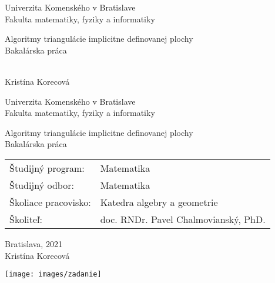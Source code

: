 \documentclass[12pt, twoside]{book}
\def\mfrok{2021}
\def\mfnazov{Algoritmy triangulácie implicitne definovanej plochy}
\def\mftyp{Bakalárska práca}
\def\mfautor{Kristína Korecová}
\def\mfskolitel{doc. RNDr. Pavel Chalmovianský, PhD. }
\def\mfkonzultant{tit. Meno Priezvisko, tit. }
\def\mfmiesto{Bratislava, \mfrok}
\def\mfodbor{ Matematika }
\def\program{ Matematika }
\def\mfpracovisko{ Katedra algebry a geometrie }
\begin{document}
     
\frontmatter


\thispagestyle{empty}

\begin{center}
\sc\large
Univerzita Komenského v Bratislave\\
Fakulta matematiky, fyziky a informatiky

\vfill

{\LARGE\mfnazov}\\
\mftyp
\end{center}

\vfill

{\sc\large 
\noindent \mfrok\\
\mfautor
}

\cleardoublepage


\thispagestyle{empty}
\noindent

\begin{center}
\sc  
\large
Univerzita Komenského v Bratislave\\
Fakulta matematiky, fyziky a informatiky

\vfill

{\LARGE\mfnazov}\\
\mftyp
\end{center}

\vfill

\noindent
\begin{tabular}{ll}
Študijný program: & \program \\
Študijný odbor: & \mfodbor \\
Školiace pracovisko: & \mfpracovisko \\
Školiteľ: & \mfskolitel \\
\end{tabular}

\vfill


\noindent \mfmiesto\\
\mfautor

\cleardoublepage



\newpage 
\thispagestyle{empty}
\hspace{-2cm}\texttt{[image: images/zadanie]}
\end{document}
